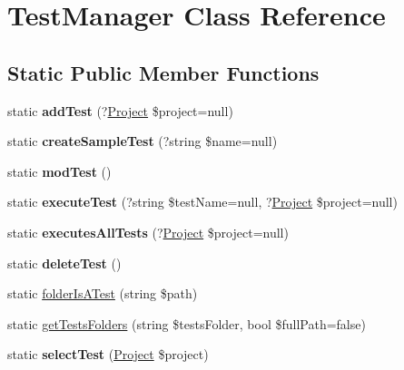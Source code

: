 \hypertarget{classTestManager}{}\section{Test\+Manager Class Reference}
\label{classTestManager}
\subsection*{Static Public Member Functions}
\begin{DoxyCompactItemize}
\item 
\mbox{\label{classTestManager_aa9e3945c44816be04e329864d5a2e62f}} 
static {\bfseries add\+Test} (?\hyperlink{classProject}{Project} \$project=null)
\item 
\mbox{\label{classTestManager_aee45ea866ce32f86451843a567db9e80}} 
static {\bfseries create\+Sample\+Test} (?string \$name=null)
\item 
\mbox{\label{classTestManager_a3d44eb840485d2f33dee6598e0e3b0ba}} 
static {\bfseries mod\+Test} ()
\item 
\mbox{\label{classTestManager_a97efdce7cd3add364637cc24a15a4c48}} 
static {\bfseries execute\+Test} (?string \$test\+Name=null, ?\hyperlink{classProject}{Project} \$project=null)
\item 
\mbox{\label{classTestManager_a4a11654c5a32e8f0ccdd582bdb3ef1fa}} 
static {\bfseries executes\+All\+Tests} (?\hyperlink{classProject}{Project} \$project=null)
\item 
\mbox{\label{classTestManager_a19a87ea290be92044cea0d5606541c37}} 
static {\bfseries delete\+Test} ()
\item 
static \hyperlink{classTestManager_a0f62639ed81588be321cafc0a23ac290}{folder\+Is\+A\+Test} (string \$path)
\item 
static \hyperlink{classTestManager_aa6ec0809a03f384869c41f51507a2fd4}{get\+Tests\+Folders} (string \$tests\+Folder, bool \$full\+Path=false)
\item 
\mbox{\label{classTestManager_ad9a11b0c53f20112d0685e4700fcfa12}} 
static {\bfseries select\+Test} (\hyperlink{classProject}{Project} \$project)
\end{DoxyCompactItemize}


